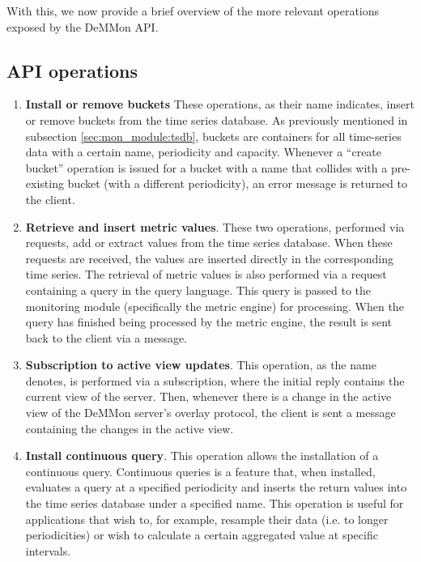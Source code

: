 With this, we now provide a brief overview of the more relevant operations exposed by the DeMMon API.

\subsection{API operations}

\begin{enumerate}
    \item \textbf{Install or remove buckets} These operations, as their name indicates, insert or remove buckets from the time series database. As previously mentioned in subsection \ref{sec:mon_module:tsdb}, buckets are containers for all time-series data with a certain name, periodicity and capacity. Whenever a ``create bucket'' operation is issued for a bucket with a name that collides with a pre-existing bucket (with a different periodicity), an error message is returned to the client.
    
    \item \textbf{Retrieve and insert metric values}. These two operations, performed via requests, add or extract values from the time series database. When these requests are received, the values are inserted directly in the corresponding time series. The retrieval of metric values is also performed via a request containing a query in the query language. This query is passed to the monitoring module (specifically the metric engine) for processing. When the query has finished being processed by the metric engine, the result is sent back to the client via a message.
    
    \item \textbf{Subscription to active view updates}. This operation, as the name denotes, is performed via a subscription, where the initial reply contains the current view of the server. Then, whenever there is a change in the active view of the DeMMon server's overlay protocol, the client is sent a message containing the changes in the active view.
    
    \item \textbf{Install continuous query}. This operation allows the installation of a continuous query. Continuous queries is a feature that, when installed, evaluates a query at a specified periodicity and inserts the return values into the time series database under a specified name. This operation is useful for applications that wish to, for example, resample their data (i.e. to longer periodicities) or wish to calculate a certain aggregated value at specific intervals. 


\end{enumerate}
